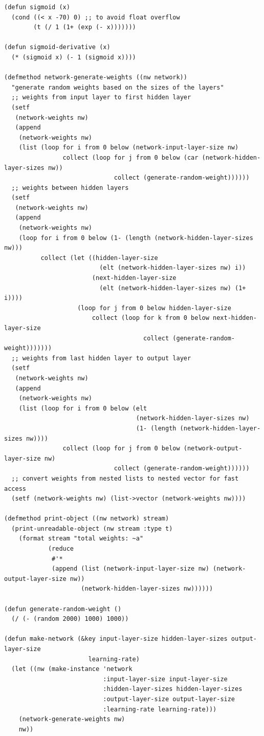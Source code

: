 \documentclass[a4paper,12pt]{article}
\begin{document}
\begin{lstlisting}
(defun sigmoid (x)
  (cond ((< x -70) 0) ;; to avoid float overflow
        (t (/ 1 (1+ (exp (- x)))))))

(defun sigmoid-derivative (x)
  (* (sigmoid x) (- 1 (sigmoid x))))

(defmethod network-generate-weights ((nw network))
  "generate random weights based on the sizes of the layers"
  ;; weights from input layer to first hidden layer
  (setf
   (network-weights nw)
   (append
    (network-weights nw)
    (list (loop for i from 0 below (network-input-layer-size nw)
                collect (loop for j from 0 below (car (network-hidden-layer-sizes nw))
                              collect (generate-random-weight))))))
  ;; weights between hidden layers
  (setf
   (network-weights nw)
   (append
    (network-weights nw)
    (loop for i from 0 below (1- (length (network-hidden-layer-sizes nw)))
          collect (let ((hidden-layer-size
                          (elt (network-hidden-layer-sizes nw) i))
                        (next-hidden-layer-size
                          (elt (network-hidden-layer-sizes nw) (1+ i))))
                    (loop for j from 0 below hidden-layer-size
                        collect (loop for k from 0 below next-hidden-layer-size
                                      collect (generate-random-weight)))))))
  ;; weights from last hidden layer to output layer
  (setf
   (network-weights nw)
   (append
    (network-weights nw)
    (list (loop for i from 0 below (elt
                                    (network-hidden-layer-sizes nw)
                                    (1- (length (network-hidden-layer-sizes nw))))
                collect (loop for j from 0 below (network-output-layer-size nw)
                              collect (generate-random-weight))))))
  ;; convert weights from nested lists to nested vector for fast access
  (setf (network-weights nw) (list->vector (network-weights nw))))

(defmethod print-object ((nw network) stream)
  (print-unreadable-object (nw stream :type t)
    (format stream "total weights: ~a"
            (reduce
             #'*
             (append (list (network-input-layer-size nw) (network-output-layer-size nw))
                     (network-hidden-layer-sizes nw))))))

(defun generate-random-weight ()
  (/ (- (random 2000) 1000) 1000))

(defun make-network (&key input-layer-size hidden-layer-sizes output-layer-size
                       learning-rate)
  (let ((nw (make-instance 'network
                           :input-layer-size input-layer-size
                           :hidden-layer-sizes hidden-layer-sizes
                           :output-layer-size output-layer-size
                           :learning-rate learning-rate)))
    (network-generate-weights nw)
    nw))
\end{lstlisting}
\end{document}
